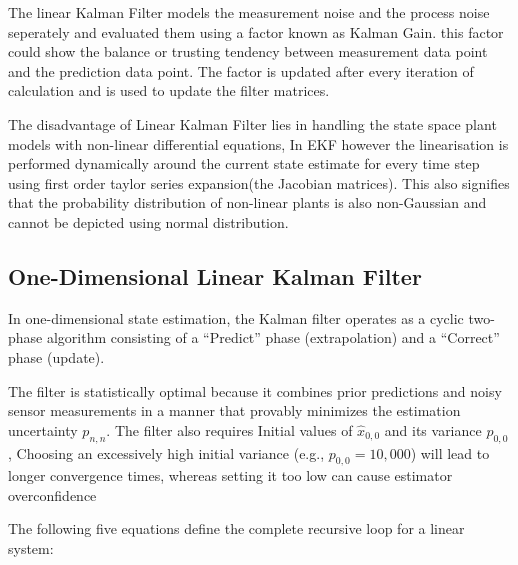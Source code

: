 The linear Kalman Filter models the measurement noise and the process noise seperately and evaluated them using a factor known as Kalman Gain. this factor could show the balance or trusting tendency between measurement data point and the prediction data point. The factor is updated after every iteration of calculation and is used to update the filter matrices.

The disadvantage of Linear Kalman Filter lies in handling the state space plant models with non-linear differential equations, In EKF however the linearisation is performed dynamically around the current state estimate for every time step using first order taylor series expansion(the Jacobian matrices). This also signifies that the probability distribution of non-linear plants is also non-Gaussian and cannot be depicted using normal distribution. 

\subsection{One-Dimensional Linear Kalman Filter}
\label{sec:kalman_filter_1d}

In one-dimensional state estimation, the Kalman filter operates as a cyclic two-phase algorithm consisting of a \enquote{Predict} phase (extrapolation) and a \enquote{Correct} phase (update).~\cite{CC17}%

The filter is statistically optimal because it combines prior predictions and noisy sensor measurements in a manner that provably minimizes the estimation uncertainty $p_{n,n}$. The filter also requires Initial values of $\hat{x}_{0,0}$ and its variance $p_{0,0}$, Choosing an excessively high initial variance (e.g., $p_{0,0}=10{,}000$) will lead to longer convergence times, whereas setting it too low can cause estimator overconfidence

The following five equations define the complete recursive loop for a linear system:

